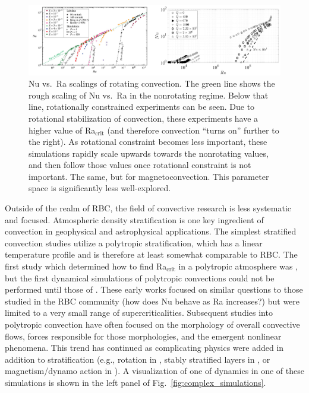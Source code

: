 \begin{figure}[t!]
\includegraphics[width=\textwidth]{./figs/intro/rotation_mhd_rayleigh_benard.pdf}
\caption[Modification of Nu vs.~Ra in rotating RBC and magnetoconvection.]
{
	\citep[left, Fig.~1 of][]{julien&all2016} Nu vs.~Ra scalings of rotating \RB convection.
	The green line shows the rough scaling of Nu vs.~Ra in the nonrotating regime.
	Below that line, rotationally constrained experiments can be seen.
	Due to rotational stabilization of convection, these experiments have a higher value of Ra$_{\text{crit}}$ (and therefore convection ``turns on'' further to the right).
	As rotational constraint becomes less important, these simulations rapidly scale upwards towards the nonrotating values, and then follow those values once rotational constraint is not important.
	\citep[right, Fig.~4 of][]{plumley&julien2019} The same, but for magnetoconvection.
	This parameter space is significantly less well-explored.
	\label{fig:rotation_mhd_rayleigh_benard} 
}
\end{figure}


Outside of the realm of RBC, the field of convective research is less systematic and focused.
Atmospheric density stratification is one key ingredient of convection in geophysical and astrophysical applications.
The simplest stratified convection studies utilize a polytropic stratification, which has a linear temperature profile and is therefore at least somewhat comparable to RBC.
The first study which determined how to find Ra$_{\text{crit}}$ in a polytropic atmosphere was \citet{unnoetall1960}, but the first dynamical simulations of polytropic convections could not be performed until those of \citet{graham1975}.
These early works focused on similar questions to those studied in the RBC community (how does Nu behave as Ra increases?) but were limited to a very small range of supercriticalities.
Subsequent studies into polytropic convection \citep[e.g.,][]{hurlburt&all1984, cattaneo&all1991} have often focused on the morphology of overall convective flows, forces responsible for those morphologies, and the emergent nonlinear phenomena.
This trend has continued as complicating physics were added in addition to stratification (e.g., rotation in \citet{brummell&all1996, brummell&all1998}, stably stratified layers in \citet{hurlburt&all1986, singh&all1995, brummell&all2002}, or magnetism/dynamo action in \citet{nordlund&all1992, brandenburg&all1996, tobias&all1998}).
A visualization of one of dynamics in one of these simulations is shown in the left panel of Fig.~\ref{fig:complex_simulations}.

